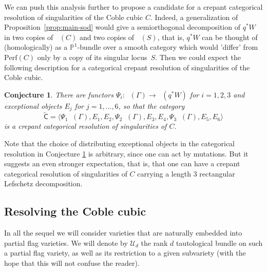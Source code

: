 \documentclass[JEP,XML,SOM,Unicode,NoEqCountersInSection]{cedram}
\newcommand{\Perf}{\mathrm{Perf}}
\let\mathcal\mathscr
\theoremstyle{plain}
\newtheorem{conjecture}[theorem]{Conjecture}
\theoremstyle{definition}
\newcommand{\cat}[1]{\mathsf{#1}}
\newcommand{\sod}[1]{\langle #1 \rangle}
\DeclareMathOperator{\Db}{{\cat{D}^{\mathrm{b}}}}
\newcommand{\PP}{\mathbb{P}}
\newcommand{\sheaf}[1]{\mathcal{#1}}
\newcommand{\ku}{\sheaf{U}}
\begin{document}
We can push this analysis further to propose a candidate for a crepant categorical resolution of singularities
of the Coble cubic $C$. Indeed, a generalization of Proposition~\ref{prop:main-sod} would give a semiorthogonal
decomposition of $q^* W$ in two copies of $\Db(C)$ and two copies of $\Db(S)$, that is, $q^* W$ can be thought of
(homologically) as a $\PP^1$\nobreakdash-bundle over a smooth category which would 'differ' from $\Perf(C)$ only
by a copy of its singular locus~$S$. Then we could expect the following description for a categorical crepant
resolution of singularities of the Coble cubic.

\begin{conjecture}\label{conj:resol-Coble}
There are functors $\Psi_i: \Db(\Gamma) \to \Db(q^* W)$ for $i=1,2,3$ and exceptional objects $E_j$
for $j=1,\ldots,6$, so that the category
\[
\widetilde{\cat{C}}= \sod{\Psi_1 \Db(\Gamma),E_1,E_2,\Psi_2 \Db(\Gamma),E_3,E_4,\Psi_3 \Db(\Gamma),E_5,E_6}
\]
is a crepant categorical resolution of singularities of $C$.
\end{conjecture}
Note that the choice of distributing exceptional objects in the categorical resolution in Conjecture
\ref{conj:resol-Coble} is arbitrary, since one can act by mutations. But it suggests an even stronger
expectation, that is, that one can have a crepant categorical resolution of singularities of $C$
carrying a length 3 rectangular Lefschetz decomposition.

\subsection{Resolving the Coble cubic}
In all the sequel we will consider varieties that are naturally embedded into partial
flag varieties. We will denote by $\ku_d$ the rank $d$ tautological bundle on such a
partial flag variety, as well as its restriction to a given subvariety (with the hope
that this will not confuse the reader).
\end{document}
